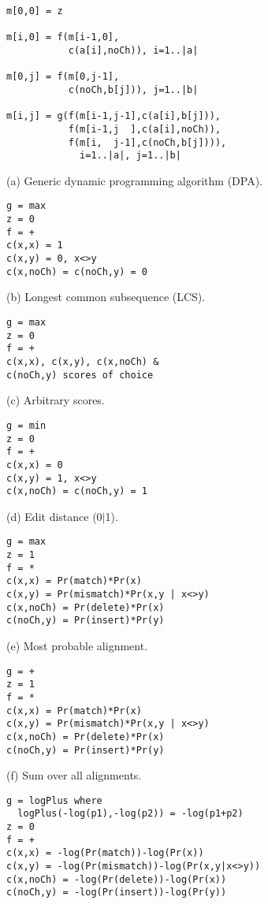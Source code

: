 \documentclass[a4paper,11pt,oneside]{article}
\begin{document}
\begin{figure}
\begin{minipage}{\textwidth}
\begin{multicols}{2}

\footnotesize
\begin{verbatim}
m[0,0] = z

m[i,0] = f(m[i-1,0],
           c(a[i],noCh)), i=1..|a|

m[0,j] = f(m[0,j-1],
           c(noCh,b[j])), j=1..|b|

m[i,j] = g(f(m[i-1,j-1],c(a[i],b[j])),
           f(m[i-1,j  ],c(a[i],noCh)),
           f(m[i,  j-1],c(noCh,b[j]))),
             i=1..|a|, j=1..|b|
\end{verbatim}

(a) Generic dynamic programming algorithm (DPA).


\begin{verbatim}
g = max
z = 0
f = +
c(x,x) = 1
c(x,y) = 0, x<>y
c(x,noCh) = c(noCh,y) = 0
\end{verbatim}

(b) Longest common subsequence (LCS).


\begin{verbatim}
g = max
z = 0
f = +
c(x,x), c(x,y), c(x,noCh) &
c(noCh,y) scores of choice
\end{verbatim}

(c) Arbitrary scores.


\begin{verbatim}
g = min
z = 0
f = +
c(x,x) = 0
c(x,y) = 1, x<>y
c(x,noCh) = c(noCh,y) = 1
\end{verbatim}

(d) Edit distance (0$|$1).


\begin{verbatim}
g = max
z = 1
f = *
c(x,x) = Pr(match)*Pr(x)
c(x,y) = Pr(mismatch)*Pr(x,y | x<>y)
c(x,noCh) = Pr(delete)*Pr(x)
c(noCh,y) = Pr(insert)*Pr(y)
\end{verbatim}

(e) Most probable alignment.


\begin{verbatim}
g = +
z = 1
f = *
c(x,x) = Pr(match)*Pr(x)
c(x,y) = Pr(mismatch)*Pr(x,y | x<>y)
c(x,noCh) = Pr(delete)*Pr(x)
c(noCh,y) = Pr(insert)*Pr(y)
\end{verbatim}

(f) Sum over all alignments.


\begin{verbatim}
g = logPlus where
  logPlus(-log(p1),-log(p2)) = -log(p1+p2)
z = 0
f = +
c(x,x) = -log(Pr(match))-log(Pr(x))
c(x,y) = -log(Pr(mismatch))-log(Pr(x,y|x<>y))
c(x,noCh) = -log(Pr(delete))-log(Pr(x))
c(noCh,y) = -log(Pr(insert))-log(Pr(y))
\end{verbatim}


\end{multicols}
\end{minipage}
\end{figure}
\end{document}
